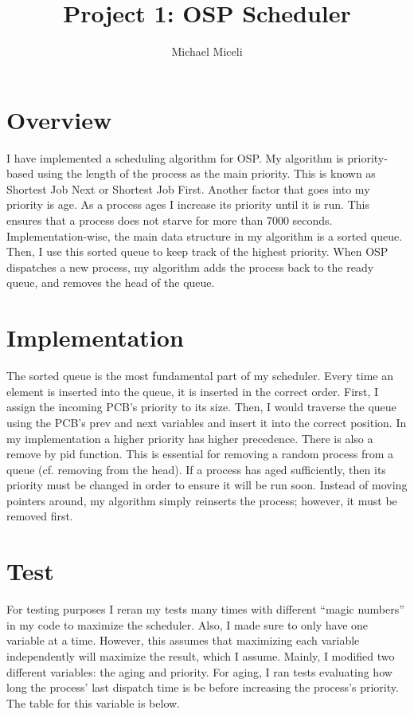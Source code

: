 \documentclass{article}
\title{Project 1:  OSP Scheduler}
\author{Michael Miceli}
\begin{document}
\maketitle
\doublespacing

\section{Overview}

I have implemented a scheduling algorithm for OSP.  My algorithm is priority-based using the length of the process as the main priority.  This is known as Shortest Job Next or Shortest Job First.  Another factor that goes into my priority is age.  As a process ages I increase its priority until it is run.  This ensures that a process does not starve for more than 7000 seconds.  Implementation-wise, the main data structure in my algorithm is a sorted queue.  Then, I use this sorted queue to keep track of the highest priority.  When OSP dispatches a new process, my algorithm adds the process back to the ready queue, and removes the head of the queue.

\section{Implementation}

\indent The sorted queue is the most fundamental part of my scheduler.  Every time an element is inserted into the queue, it is inserted in the correct order.  First, I assign the incoming PCB's priority to its size.  Then, I would traverse the queue using the PCB's prev and next variables and insert it into the correct position.  In my implementation a higher priority has higher precedence.  There is also a remove by pid function.  This is essential for removing a random process from a queue (cf. removing from the head).  If a process has aged sufficiently, then its priority must be changed in order to ensure it will be run soon.  Instead of moving pointers around, my algorithm simply reinserts the process; however, it must be removed first.

\section{Test}

\indent For testing purposes I reran my tests many times with different “magic numbers” in my code to maximize the scheduler.  Also, I made sure to only have one variable at a time.  However, this assumes that maximizing each variable independently will maximize the result, which I assume.  Mainly, I modified two different variables:  the aging and priority.  For aging, I ran tests evaluating how long the process' last dispatch time is be before increasing the process's priority.  The table for this variable is below.
\end{document}

